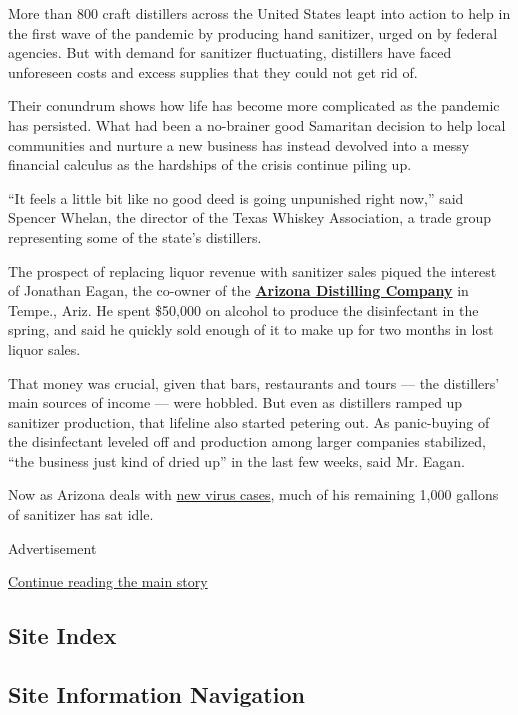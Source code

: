 More than 800 craft distillers across the United States leapt into
action to help in the first wave of the pandemic by producing hand
sanitizer, urged on by federal agencies. But with demand for sanitizer
fluctuating, distillers have faced unforeseen costs and excess supplies
that they could not get rid of.

Their conundrum shows how life has become more complicated as the
pandemic has persisted. What had been a no-brainer good Samaritan
decision to help local communities and nurture a new business has
instead devolved into a messy financial calculus as the hardships of the
crisis continue piling up.

``It feels a little bit like no good deed is going unpunished right
now,'' said Spencer Whelan, the director of the Texas Whiskey
Association, a trade group representing some of the state's distillers.

The prospect of replacing liquor revenue with sanitizer sales piqued the
interest of Jonathan Eagan, the co-owner of the
\textbf{\href{https://azdistilling.com/}{Arizona Distilling Company}} in
Tempe., Ariz. He spent \$50,000 on alcohol to produce the disinfectant
in the spring, and said he quickly sold enough of it to make up for two
months in lost liquor sales.

That money was crucial, given that bars, restaurants and tours --- the
distillers' main sources of income --- were hobbled. But even as
distillers ramped up sanitizer production, that lifeline also started
petering out. As panic-buying of the disinfectant leveled off and
production among larger companies stabilized, ``the business just kind
of dried up'' in the last few weeks, said Mr. Eagan.

Now as Arizona deals with
\href{https://www.nytimes.com/interactive/2020/07/09/us/coronavirus-cases-reopening-trends.html}{new
virus cases}, much of his remaining 1,000 gallons of sanitizer has sat
idle.

Advertisement

\protect\hyperlink{after-bottom}{Continue reading the main story}

\hypertarget{site-index}{%
\subsection{Site Index}\label{site-index}}

\hypertarget{site-information-navigation}{%
\subsection{Site Information
Navigation}\label{site-information-navigation}}

